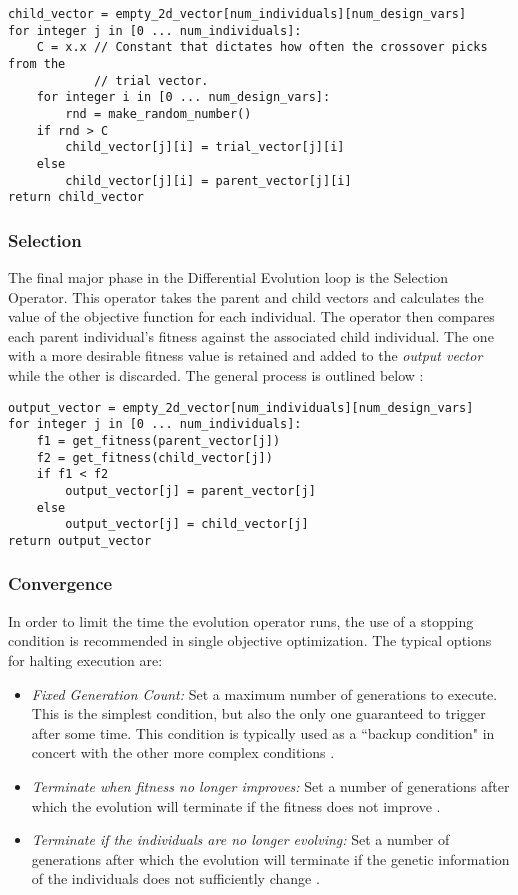 \begin{lstlisting}[caption=Pseudo-code for the Crossover Operator \cite{diff-evol},captionpos=b]
child_vector = empty_2d_vector[num_individuals][num_design_vars]
for integer j in [0 ... num_individuals]:
    C = x.x // Constant that dictates how often the crossover picks from the
            // trial vector. 
    for integer i in [0 ... num_design_vars]:
        rnd = make_random_number()
	if rnd > C
	    child_vector[j][i] = trial_vector[j][i]
	else
	    child_vector[j][i] = parent_vector[j][i]
return child_vector
\end{lstlisting}

\subsubsection{Selection}
The final major phase in the Differential Evolution loop is the Selection Operator. This operator takes the parent and child vectors and calculates the value of the objective function for each individual. The operator then compares each parent individual's fitness against the associated child individual. The one with a more desirable fitness value is retained and added to the \emph{output vector} while the other is discarded. The general process is outlined below \cite{diff-evol}:

\begin{lstlisting}[label=lst:sel,caption=Pseudocode for the Selection Operator (Assuming a minimization approach) \cite{diff-evol},captionpos=b]
output_vector = empty_2d_vector[num_individuals][num_design_vars]
for integer j in [0 ... num_individuals]:
    f1 = get_fitness(parent_vector[j])
    f2 = get_fitness(child_vector[j])
    if f1 < f2
        output_vector[j] = parent_vector[j]
    else
        output_vector[j] = child_vector[j]
return output_vector
\end{lstlisting}

\subsubsection{Convergence}
In order to limit the time the evolution operator runs, the use of a stopping condition is recommended in single objective optimization. The typical options for halting execution are: 

\begin{itemize}
\item \emph{Fixed Generation Count:} Set a maximum number of generations to execute. This is the simplest condition, but also the only one guaranteed to trigger after some time. This condition is typically used as a ``backup condition" in concert with the other more complex conditions \cite{diff-evol}. 
\item \emph{Terminate when fitness no longer improves:} Set a number of generations after which the evolution will terminate if the fitness does not improve \cite{diff-evol}. 
\item \emph{Terminate if the individuals are no longer evolving:} Set a number of generations after which the evolution will terminate if the genetic information of the individuals does not sufficiently change \cite{diff-evol}.
\end{itemize}

